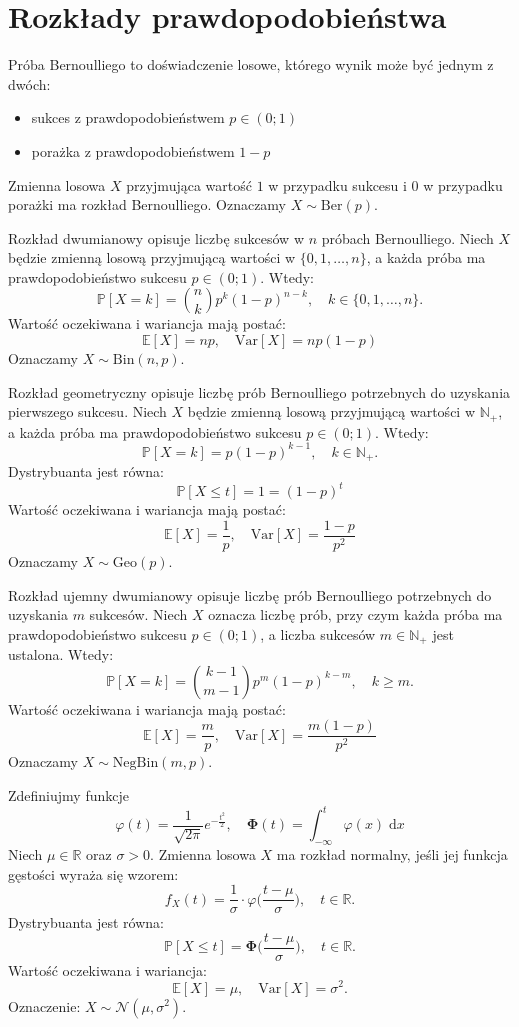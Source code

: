 \section{Rozkłady prawdopodobieństwa}

Próba Bernoulliego to doświadczenie losowe, którego wynik może być jednym z dwóch:
\begin{itemize}
    \item sukces z prawdopodobieństwem  $p \in (0;1)$
    \item porażka z prawdopodobieństwem  $1 - p$
\end{itemize}  
Zmienna losowa $X$ przyjmująca wartość $1$ w przypadku sukcesu i $0$ w przypadku porażki ma rozkład Bernoulliego. Oznaczamy $X \sim \mathrm{Ber}(p)$.
 
Rozkład dwumianowy opisuje liczbę sukcesów w $n$ próbach Bernoulliego. Niech $X$ będzie zmienną losową przyjmującą wartości w $\{0,1,\dots,n\}$, a każda próba ma prawdopodobieństwo sukcesu $p \in (0;1)$.  
Wtedy:
\[
\mathbb{P}[X = k] = \binom{n}{k}p^k{(1-p)}^{n-k}, \quad k \in \{0,1,\dots,n\}.
\]
Wartość oczekiwana i wariancja mają postać:
\[
    \mathbb{E}[X] = np, \quad \mathrm{Var}[X] = np(1-p)
\]
Oznaczamy $X \sim \mathrm{Bin}(n,p)$.

Rozkład geometryczny opisuje liczbę prób Bernoulliego potrzebnych do uzyskania pierwszego sukcesu.  
Niech $X$ będzie zmienną losową przyjmującą wartości w $\mathbb{N}_+$, a każda próba ma prawdopodobieństwo sukcesu $p \in (0;1)$.  
Wtedy:
\[
    \mathbb{P}[X = k] = p{(1 - p)}^{k-1}, \quad k \in \mathbb{N}_+.
\]
Dystrybuanta jest równa:
\[
    \mathbb{P}[X\le t] = 1 = {(1-p)}^t
\]
Wartość oczekiwana i wariancja mają postać:
\[
    \mathbb{E}[X] = \frac{1}{p}, \quad \mathrm{Var}[X] = \frac{1 - p}{p^2}
\]
Oznaczamy $X \sim \mathrm{Geo}(p)$.

Rozkład ujemny dwumianowy opisuje liczbę prób Bernoulliego potrzebnych do uzyskania $m$ sukcesów.  
Niech $X$ oznacza liczbę prób, przy czym każda próba ma prawdopodobieństwo sukcesu $p \in (0;1)$, a liczba sukcesów $m \in \mathbb{N}_+$ jest ustalona.  
Wtedy:
\[
\mathbb{P}[X = k] = \binom{k-1}{m-1} p^m {(1 - p)}^{k - m}, \quad k \ge m.
\]
Wartość oczekiwana i wariancja mają postać:
\[
    \mathbb{E}[X] = \frac{m}{p}, \quad \mathrm{Var}[X] = \frac{m(1 - p)}{p^2}
\]
Oznaczamy $X \sim \mathrm{NegBin}(m, p)$.

Zdefiniujmy funkcje
\[
    \varphi(t)=\frac{1}{\sqrt{2\pi}}e^{-\frac{t^2}{2}}, \quad \mathbf{\Phi}(t)=\int_{-\infty}^{t} \varphi(x)\;\mathrm{d}x
\]
Niech $\mu \in \mathbb{R}$ oraz $\sigma > 0$. Zmienna losowa $X$ ma rozkład normalny, jeśli jej funkcja gęstości wyraża się wzorem:
\[
f_X(t) = \frac{1}{\sigma}\cdot\varphi\Big(\frac{t-\mu}{\sigma}\Big), \quad t \in \mathbb{R}.
\]
Dystrybuanta jest równa:
\[
\mathbb{P}[X \le t] = \mathbf{\Phi}\Big(\frac{t-\mu}{\sigma}\Big), \quad t \in \mathbb{R}.
\]
Wartość oczekiwana i wariancja:
\[
\mathbb{E}[X] = \mu, \quad \mathrm{Var}[X] = \sigma^2.
\]
Oznaczenie: $X \sim \mathcal{N}(\mu, \sigma^2)$.

